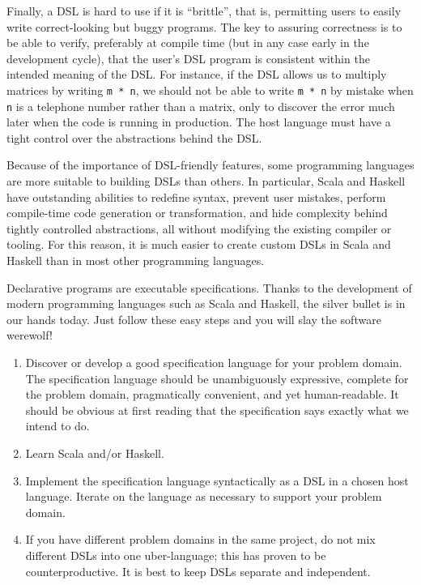 Finally, a DSL is hard to use if it is \textsf{``}brittle\textsf{''}, \textemdash{}
that is, permitting users to easily write correct-looking but buggy
programs. The key to assuring correctness is to be able to verify,
preferably at compile time (but in any case early in the development
cycle), that the user\textsf{'}s DSL program is consistent within the intended
meaning of the DSL. For instance, if the DSL allows us to multiply
matrices by writing \lstinline!m * n!, we should not be able to write
\lstinline!m * n! by mistake when \lstinline!n! is a telephone number
rather than a matrix, only to discover the error much later when the
code is running in production. The host language must have a tight
control over the abstractions behind the DSL.

Because of the importance of DSL-friendly features, some programming
languages are more suitable to building DSLs than others. In particular,
Scala and Haskell have outstanding abilities to redefine syntax, prevent
user mistakes, perform compile-time code generation or transformation,
and hide complexity behind tightly controlled abstractions, \textemdash{}
all without modifying the existing compiler or tooling. For this reason,
it is much easier to create custom DSLs in Scala and Haskell than
in most other programming languages. 


Declarative programs are executable specifications. Thanks to the
development of modern programming languages such as Scala and Haskell,
the silver bullet is in our hands today. Just follow these easy steps
and you will slay the software werewolf!
\begin{enumerate}
\item Discover or develop a good specification language for your problem
domain. The specification language should be unambiguously expressive,
complete for the problem domain, pragmatically convenient, and yet
human-readable. It should be obvious at first reading that the specification
says exactly what we intend to do.
\item Learn Scala and/or Haskell. 
\item Implement the specification language syntactically as a DSL in a chosen
host language. Iterate on the language as necessary to support your
problem domain. 
\item If you have different problem domains in the same project, do not
mix different DSLs into one uber-language; this has proven to be counterproductive.
It is best to keep DSLs separate and independent.
\end{enumerate}

